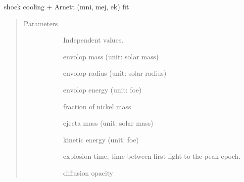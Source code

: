 \documentclass[letterpaper,10pt,english]{sphinxmanual}
\begin{document}
\begin{fulllineitems}
\label{\detokenize{generated/sdapy.models.sbo.shock_arnett_mejek_fit:sdapy.models.sbo.shock_arnett_mejek_fit}}
shock cooling + Arnett (mni, mej, ek) fit
\begin{quote}\begin{description}
\item[{Parameters}] \leavevmode\begin{description}
\item[{}] \leavevmode{[}\sphinxtitleref{array}{]}
Independent values.

\item[{}] \leavevmode{[}\sphinxtitleref{float}{]}
envolop mass (unit: solar mass)

\item[{}] \leavevmode{[}\sphinxtitleref{float}{]}
envolop radius (unit: solar radius)

\item[{}] \leavevmode{[}\sphinxtitleref{float}{]}
envolop energy (unit: foe)

\item[{}] \leavevmode{[}\sphinxtitleref{float}{]}
fraction of nickel mass

\item[{}] \leavevmode{[}\sphinxtitleref{float}{]}
ejecta mass (unit: solar mass)

\item[{}] \leavevmode{[}\sphinxtitleref{float}{]}
kinetic energy (unit: foe)

\item[{}] \leavevmode{[}\sphinxtitleref{float}{]}
explosion time, time between first light to the peak epoch.

\item[{}] \leavevmode{[}\sphinxtitleref{float}{]}
diffusion opacity

\end{description}

\end{description}\end{quote}

\end{fulllineitems}
\end{document}
